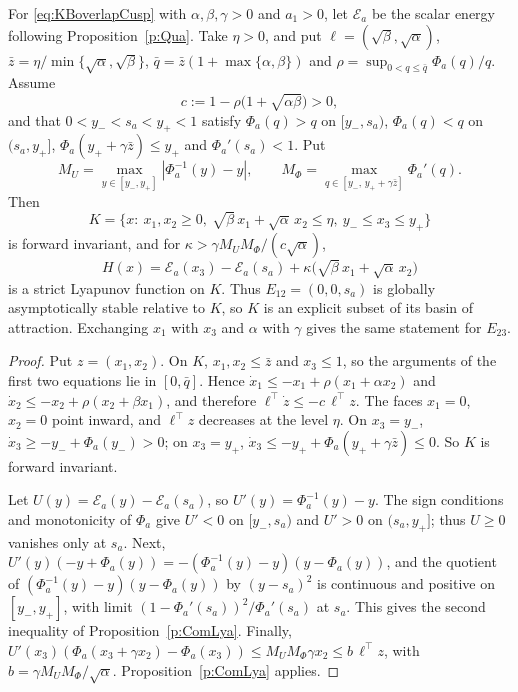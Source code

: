 For \eqref{eq:KBoverlapCusp} with $\alpha,\beta,\gamma>0$ and $a_1>0$, let $\mathcal E_a$ be the
scalar energy following Proposition~\ref{p:Qua}. Take $\eta>0$, and put
$\ell=(\sqrt\beta,\sqrt\alpha)$, $\bar z=\eta/\min\{\sqrt\alpha,\sqrt\beta\}$,
$\bar q=\bar z(1+\max\{\alpha,\beta\})$ and $\rho=\sup_{0<q\le\bar q}\Phi_a(q)/q$. Assume
\[
 c:=1-\rho\bigl(1+\sqrt{\alpha\beta}\bigr)>0,
\]
and that $0<y_-<s_a<y_+<1$ satisfy $\Phi_a(q)>q$ on $[y_-,s_a)$, $\Phi_a(q)<q$ on $(s_a,y_+]$,
$\Phi_a(y_++\gamma\bar z)\le y_+$ and $\Phi_a'(s_a)<1$. Put
\[
 M_U=\max_{y\in[y_-,y_+]}|\Phi_a^{-1}(y)-y|,\qquad
 M_\Phi=\max_{q\in[y_-,\,y_++\gamma\bar z]}\Phi_a'(q).
\]
Then
\[
 K=\{x:\ x_1,x_2\ge0,\ \sqrt\beta\,x_1+\sqrt\alpha\,x_2\le\eta,\ y_-\le x_3\le y_+\}
\]
is forward invariant, and for $\kappa>\gamma M_UM_\Phi/(c\sqrt\alpha)$,
\[
 H(x)=\mathcal E_a(x_3)-\mathcal E_a(s_a)+\kappa\bigl(\sqrt\beta\,x_1+\sqrt\alpha\,x_2\bigr)
\]
is a strict Lyapunov function on $K$. Thus $E_{12}=(0,0,s_a)$ is globally asymptotically stable
relative to $K$, so $K$ is an explicit subset of its basin of attraction. Exchanging $x_1$ with $x_3$ and $\alpha$ with $\gamma$ gives the same statement for
$E_{23}$.
\eeP
\begin{proof}
Put $z=(x_1,x_2)$. On $K$, $x_1,x_2\le\bar z$ and $x_3\le1$, so the arguments of the first two equations lie
in $[0,\bar q]$. Hence $\dot x_1\le-x_1+\rho(x_1+\alpha x_2)$ and $\dot x_2\le-x_2+\rho(x_2+\beta x_1)$, and
therefore $\ell^\top\dot z\le-c\,\ell^\top z$. The faces $x_1=0$, $x_2=0$ point inward, and
$\ell^\top z$ decreases at the level $\eta$. On $x_3=y_-$, $\dot x_3\ge-y_-+\Phi_a(y_-)>0$; on $x_3=y_+$,
$\dot x_3\le-y_++\Phi_a(y_++\gamma\bar z)\le0$. So $K$ is forward invariant.

Let $U(y)=\mathcal E_a(y)-\mathcal E_a(s_a)$, so $U'(y)=\Phi_a^{-1}(y)-y$. The sign conditions and
monotonicity of $\Phi_a$ give $U'<0$ on $[y_-,s_a)$ and $U'>0$ on $(s_a,y_+]$; thus $U\ge0$ vanishes only at
$s_a$. Next, $U'(y)(-y+\Phi_a(y))=-(\Phi_a^{-1}(y)-y)(y-\Phi_a(y))$, and the quotient of
$(\Phi_a^{-1}(y)-y)(y-\Phi_a(y))$ by $(y-s_a)^2$ is continuous and positive on $[y_-,y_+]$, with limit
$(1-\Phi_a'(s_a))^2/\Phi_a'(s_a)$ at $s_a$. This gives the second inequality of
Proposition~\ref{p:ComLya}. Finally,
$U'(x_3)(\Phi_a(x_3+\gamma x_2)-\Phi_a(x_3))\le M_UM_\Phi\gamma x_2\le b\,\ell^\top z$, with
$b=\gamma M_UM_\Phi/\sqrt\alpha$. Proposition~\ref{p:ComLya} applies.
\end{proof}

